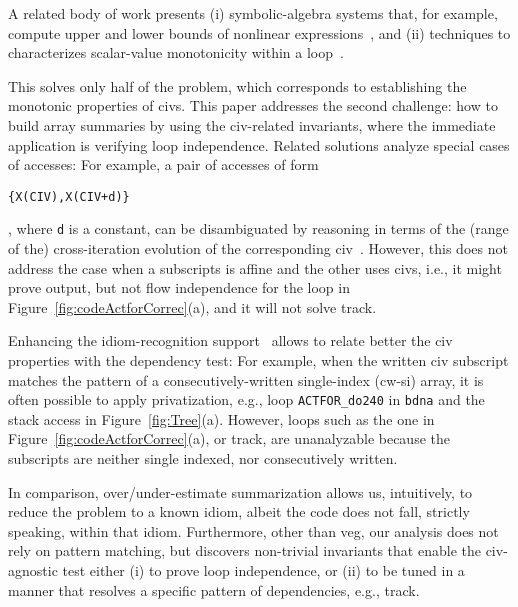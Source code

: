 \documentclass{sig-alternate}
\begin{document}
A related  body of work presents (i) symbolic-algebra systems that, for example,  
compute upper and lower bounds of nonlinear expressions~\cite{Fahringer97EffSymb},
and (ii) techniques to characterizes scalar-value monotonicity within a 
loop~\cite{VEG,MonStmt}.

This solves only half of the problem, which   
corresponds to establishing the monotonic properties of {\sc civ}s.
This paper addresses the second challenge: 
how to build array summaries by using the {\sc civ}-related invariants,
where the immediate application is verifying loop independence. 
Related solutions analyze special cases of accesses:
%
For example, a pair of accesses of form  
\begin{small}{\tt\{X(CIV),X(CIV+d)\}}\end{small}, where {\tt d} is a constant,
can be disambiguated by reasoning in terms of the (range of the) cross-iteration 
evolution of the corresponding {\sc civ}~\cite{CohenBeyondMon}.
%
However, this does not address the case when a subscripts is affine
and the other uses {\sc civ}s, i.e., it might prove output, but not 
flow independence for the loop in Figure~\ref{fig:codeActforCorrec}(a), 
and it will not solve {\sc track}. 

Enhancing the idiom-recognition support~\cite{PaduaDemDrInterproc} %
allows to relate better the {\sc civ} properties with the dependency test: 
For example, when the written {\sc civ} subscript matches the pattern 
of a consecutively-written single-index ({\sc cw-si}) array, it is often
possible to apply privatization, e.g., loop {\tt ACTFOR\_do240} in {\tt bdna}
and the stack access in Figure~\ref{fig:Tree}(a). %
%
However, loops such as the one in Figure~\ref{fig:codeActforCorrec}(a),
or {\sc track}, are unanalyzable because the subscripts are neither single 
indexed, nor consecutively written.  

In comparison, over/under-estimate summarization allows us,
intuitively, to reduce the problem to a known idiom, albeit
the code does not fall, strictly speaking, within that idiom.
Furthermore, other than {\sc veg}, our analysis does not rely
on pattern matching, but discovers non-trivial invariants that
enable the {\sc civ}-agnostic test either (i) to prove loop independence,
or (ii) to be tuned in a manner that resolves a specific pattern 
of dependencies, e.g., {\sc track}.
\end{document}
